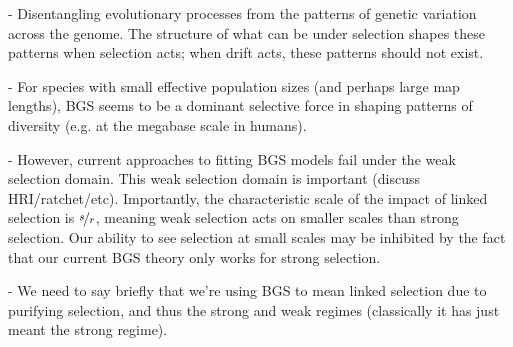 \documentclass[11pt]{article}
\begin{document}








- Disentangling evolutionary processes from the patterns of genetic variation
across the genome. The structure of what can be under selection shapes these
patterns when selection acts; when drift acts, these patterns should not exist.

- For species with small effective population sizes (and perhaps large map
lengths), BGS seems to be a dominant selective force in shaping patterns of
diversity (e.g. at the megabase scale in humans).

- However, current approaches to fitting BGS models fail under the weak
selection domain. This weak selection domain is important (discuss
HRI/ratchet/etc). Importantly, the characteristic scale of the impact of linked
selection is $\nicefrac{s}{r}$, meaning weak selection acts on smaller scales
than strong selection. Our ability to see selection at small scales may be
inhibited by the fact that our current BGS theory only works for strong
selection.

- We need to say briefly that we're using BGS to mean linked selection due to
purifying selection, and thus the strong and weak regimes (classically it has
just meant the strong regime).
\end{document}
